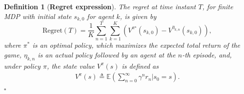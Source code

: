 \documentclass[lettersize,journal]{IEEEtran}
\newcommand*{\QEDA}{\hfill \ensuremath{\square}}
\newtheorem{definition}{Definition}
\begin{document}
\begin{definition}[\textbf{Regret expression}]
\label{definition:regret}The \textit{regret} at time instant $T$, for finite MDP with initial state $s_{k,0}$ for agent $k$, is given by  
\begin{equation}
\label{eq:regret}
\text{Regret}(T)=\frac{1}{K}\sum_{n=1}^{T}\sum_{k=1}^{K}\left(V^{\pi^\star}\left(s_{k,0}\right)-V^{\eta_{k,n}}\left(s_{k,0}\right)\right), %
\end{equation}
where $\pi^*$ is an optimal policy, which maximizes the expected total return of the game, $\eta_{k,n}$ is an actual policy followed by an agent at the $n$-th episode, and, under policy $\pi$, the state value  $V^{\pi}(s)$ is defined as 
\begin{align}
    V^{\pi}\left(s\right)\triangleq \mathbb{E}\left(\sum\limits_{n=0}^{\infty} \gamma^{n}r_{n}|s_0=s\right). \nonumber
\end{align} \QEDA
\end{definition}
\end{document}
